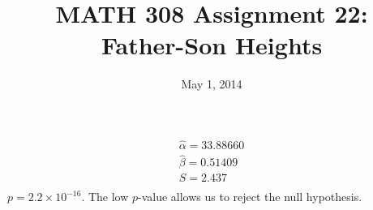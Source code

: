\documentclass[]{article}
\title{MATH 308 Assignment 22:\\Father-Son Heights}
\date{May 1, 2014}
\begin{document}
\maketitle
{}
\begin{gather*}
\hat\alpha=33.88660\\
\hat\beta=0.51409\\
S=2.437\\
\end{gather*}
$p=2.2\times10^{-16}$. The low $p$-value allows us to reject the null hypothesis.
\end{document}
